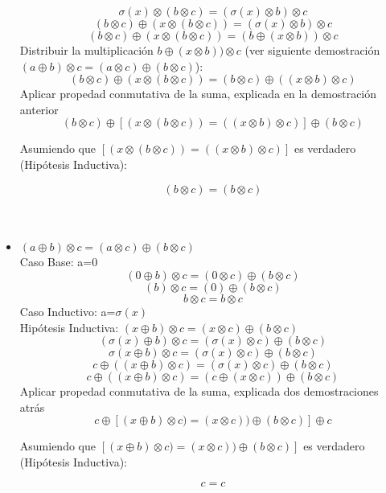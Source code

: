 \documentclass{article}
\begin{document}
\begin{itemize}
\[
       \sigma(x) \otimes (b \otimes c)=(\sigma(x)\otimes b)\otimes c
\]
\[
       (b\otimes c)\oplus(x \otimes (b \otimes c))=(\sigma(x)\otimes b)\otimes c
\]
\[
       (b\otimes c)\oplus(x \otimes (b \otimes c))= (b\oplus (x\otimes b))\otimes c
\]
Distribuir la multiplicación $b\oplus (x\otimes b))\otimes c$ (ver siguiente demostración $(a\oplus b)\otimes c = (a\otimes c) \oplus (b \otimes c)$):
\[
       (b\otimes c)\oplus(x \otimes (b \otimes c))= (b\otimes c) \oplus ((x\otimes b)\otimes c)
\]
Aplicar propedad conmutativa de la suma, explicada en la demostración anterior
\[
       (b\otimes c)\oplus[(x \otimes (b \otimes c))= ((x\otimes b)\otimes c)]\oplus (b\otimes c)
\]
\begin{center}Asumiendo que $[(x \otimes (b \otimes c))= ((x\otimes b)\otimes c)]$ es verdadero (Hipótesis Inductiva):\end{center}
\[
       (b\otimes c)= (b\otimes c)
\]
\\\\
        \item{$(a\oplus b)\otimes c = (a\otimes c) \oplus (b \otimes c)$}\\
\large{Caso Base:}
a=0
\[
       (0\oplus b)\otimes c = (0\otimes c) \oplus (b \otimes c)
\]
\[
       (b)\otimes c = (0) \oplus (b \otimes c)
\]
\[
       b\otimes c = b \otimes c
\]
\large{Caso Inductivo:}
a=$\sigma(x)$\\
Hipótesis Inductiva:
$(x\oplus b)\otimes c = (x\otimes c) \oplus (b \otimes c)$
\[
    (\sigma(x)\oplus b)\otimes c = (\sigma(x)\otimes c) \oplus (b \otimes c)   
\]
\[
    \sigma(x\oplus b)\otimes c = (\sigma(x)\otimes c) \oplus (b \otimes c)   
\]
\[
    c\oplus ((x\oplus b)\otimes c) = (\sigma(x)\otimes c) \oplus (b \otimes c)   
\]
\[
    c\oplus ((x\oplus b)\otimes c) = (c\oplus(x\otimes c)) \oplus (b \otimes c)   
\]
Aplicar propedad conmutativa de la suma, explicada dos demostraciones atrás
\[
    c\oplus [(x\oplus b)\otimes c) = (x\otimes c)) \oplus (b \otimes c)] \oplus c
\]
\begin{center}Asumiendo que $[(x\oplus b)\otimes c) = (x\otimes c)) \oplus (b \otimes c)]$ es verdadero (Hipótesis Inductiva):\end{center}
\[
   c=c
\]

\end{itemize}
\end{document}
